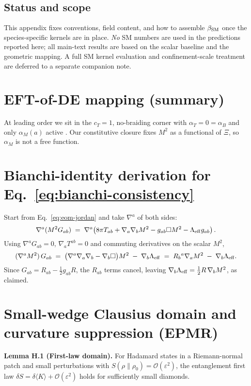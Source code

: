 \documentclass[aps,prd,onecolumn,superscriptaddress,nofootinbib]{revtex4-2}
\begin{document}
\subsection{Status and scope}
This appendix fixes conventions, field content, and how to assemble \(\beta_{\rm SM}\) once the species-specific kernels are in place. \emph{No} SM numbers are used in the predictions reported here; all main-text results are based on the scalar baseline and the geometric mapping. A full SM kernel evaluation and confinement-scale treatment are deferred to a separate companion note.

\section{EFT-of-DE mapping (summary)}
\label{app:eft}
At leading order we sit in the \(c_T=1\), no-braiding corner with \(\alpha_T=0=\alpha_B\) and only \(\alpha_M(a)\) active \cite{BelliniSawicki2014}. Our constitutive closure fixes \(M^2\) as a functional of \(\Xi\), so \(\alpha_M\) is not a free function.

\section{Bianchi-identity derivation for Eq.~\eqref{eq:bianchi-consistency}}
\label{app:bianchi-derivation}
Start from Eq.~\eqref{eq:eom-jordan} and take \(\nabla^a\) of both sides:
\[
\nabla^a(M^2 G_{ab}) \;=\; \nabla^a\!\left(8\pi T_{ab}+\nabla_a\nabla_b M^2-g_{ab}\Box M^2-\Lambda_{\rm eff} g_{ab}\right).
\]
Using \(\nabla^a G_{ab}=0\), \(\nabla_a T^{ab}=0\) and commuting derivatives on the scalar \(M^2\),
\[
(\nabla^a M^2)\,G_{ab} \;=\; \big(\nabla^a\nabla_a\nabla_b - \nabla_b\Box\big)M^2 \;-\; \nabla_b \Lambda_{\rm eff}
\;=\; R_b{}^{a}\nabla_a M^2 \;-\; \nabla_b \Lambda_{\rm eff}.
\]
Since \(G_{ab}=R_{ab}-\tfrac12 g_{ab}R\), the \(R_{ab}\) terms cancel, leaving
\(
\nabla_b \Lambda_{\rm eff} = \tfrac12 R\,\nabla_b M^2
\),
as claimed.

\section{Small-wedge Clausius domain and curvature suppression (EPMR)}
\label{app:epmr}
\noindent\textbf{Lemma H.1 (First-law domain).}
For Hadamard states in a Riemann-normal patch and small perturbations with $S(\rho\|\rho_0)=\mathcal O(\varepsilon^2)$, the entanglement first law
$\delta S=\delta\!\langle K\rangle+\mathcal O(\varepsilon^2)$
holds for sufficiently small diamonds.
\end{document}
